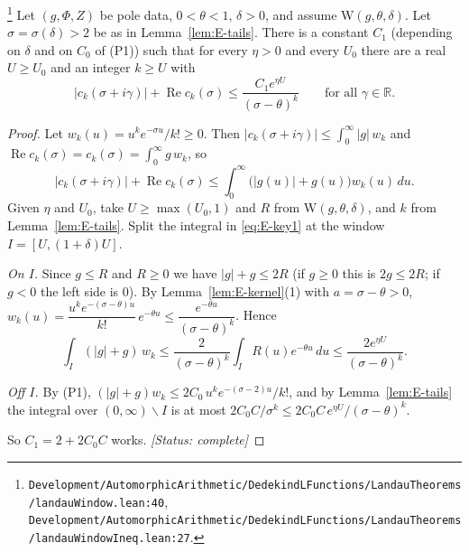 \begin{proposition}\label{prop:E-landau-key}
\footnote{\nolinkurl{Development/AutomorphicArithmetic/DedekindLFunctions/LandauTheorems/landauWindow.lean:40}, \nolinkurl{Development/AutomorphicArithmetic/DedekindLFunctions/LandauTheorems/landauWindowIneq.lean:27}.}%
Let $(g,\Phi,Z)$ be pole data, $0<\theta<1$, $\delta>0$, and assume $\mathrm W(g,\theta,\delta)$.
Let $\sigma=\sigma(\delta)>2$ be as in Lemma~\ref{lem:E-tails}. There is a constant $C_1$ (depending
on $\delta$ and on $C_0$ of \textup{(P1)}) such that for every $\eta>0$ and every $U_0$ there are a
real $U\ge U_0$ and an integer $k\ge U$ with
\[
|c_k(\sigma+i\gamma)|+\operatorname{Re}c_k(\sigma)\le\frac{C_1e^{\eta U}}{(\sigma-\theta)^{k}}
\qquad\text{for all }\gamma\in\mathbb R .
\]
\end{proposition}
\begin{proof}
Let $w_k(u)=u^{k}e^{-\sigma u}/k!\ge0$. Then
$|c_k(\sigma+i\gamma)|\le\int_0^\infty|g|\,w_k$ and
$\operatorname{Re}c_k(\sigma)=c_k(\sigma)=\int_0^\infty g\,w_k$, so
\begin{equation}\label{eq:E-key1}
|c_k(\sigma+i\gamma)|+\operatorname{Re}c_k(\sigma)\le\int_0^\infty\bigl(|g(u)|+g(u)\bigr)w_k(u)\,du .
\end{equation}
Given $\eta$ and $U_0$, take $U\ge\max(U_0,1)$ and $R$ from $\mathrm W(g,\theta,\delta)$, and $k$
from Lemma~\ref{lem:E-tails}. Split the integral in \eqref{eq:E-key1} at the window
$I=[U,(1+\delta)U]$.

\emph{On $I$.} Since $g\le R$ and $R\ge0$ we have $|g|+g\le2R$ (if $g\ge0$ this is $2g\le2R$; if
$g<0$ the left side is $0$). By Lemma~\ref{lem:E-kernel}(1) with $a=\sigma-\theta>0$,
$w_k(u)=\dfrac{u^{k}e^{-(\sigma-\theta)u}}{k!}\,e^{-\theta u}\le
\dfrac{e^{-\theta u}}{(\sigma-\theta)^{k}}$. Hence
\[
\int_I(|g|+g)\,w_k\le\frac{2}{(\sigma-\theta)^{k}}\int_IR(u)e^{-\theta u}\,du\le
\frac{2e^{\eta U}}{(\sigma-\theta)^{k}} .
\]

\emph{Off $I$.} By (P1), $(|g|+g)w_k\le2C_0\,u^{k}e^{-(\sigma-2)u}/k!$, and by
Lemma~\ref{lem:E-tails} the integral over $(0,\infty)\smallsetminus I$ is at most
$2C_0C/\sigma^{k}\le2C_0C\,e^{\eta U}/(\sigma-\theta)^{k}$.

So $C_1=2+2C_0C$ works.
\textit{[Status: complete]}
\end{proof}


